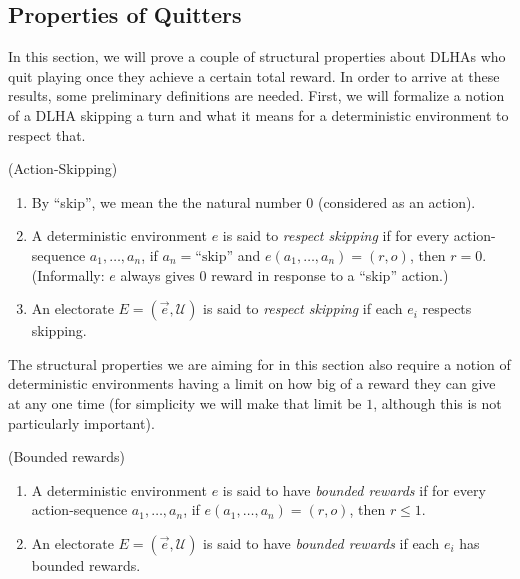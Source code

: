 \documentclass[twoside,11pt]{article}
\begin{document}
\subsection{Properties of Quitters}
\label{quittersSubSection}

In this section, we will prove a couple of structural properties about
DLHAs who quit playing once they achieve a certain total reward. In order to
arrive at these results, some preliminary definitions are needed.
First, we will formalize a notion of a DLHA skipping a turn and what
it means for a deterministic environment to respect that.

\begin{definition}
    (Action-Skipping)
    \begin{enumerate}
        \item
            By ``skip'', we mean the the natural number $0$ (considered as an action).
        \item
            A deterministic environment $e$ is said to \emph{respect skipping} if
            for every action-sequence $a_1,\ldots,a_n$, if $a_n=\mbox{``skip''}$
            and $e(a_1,\ldots,a_n)=(r,o)$, then $r=0$.
            (Informally: $e$ always gives $0$ reward in response to a ``skip''
            action.)
        \item
            An electorate $E=(\vec{e},\mathscr U)$ is said to \emph{respect skipping}
            if each $e_i$ respects skipping.
    \end{enumerate}
\end{definition}

The structural properties we are aiming for in this section also require a notion
of deterministic environments having a limit on how big of a reward they can give at any one
time (for simplicity we will make that limit be $1$, although this is
not particularly important).

\begin{definition}
    (Bounded rewards)
    \begin{enumerate}
        \item
            A deterministic environment $e$ is said to have \emph{bounded rewards}
            if for every action-sequence $a_1,\ldots,a_n$,
            if $e(a_1,\ldots,a_n)=(r,o)$, then $r\leq 1$.
        \item
            An electorate $E=(\vec{e},\mathscr U)$ is said to have
            \emph{bounded rewards} if each $e_i$ has bounded rewards.
    \end{enumerate}
\end{definition}
\end{document}
